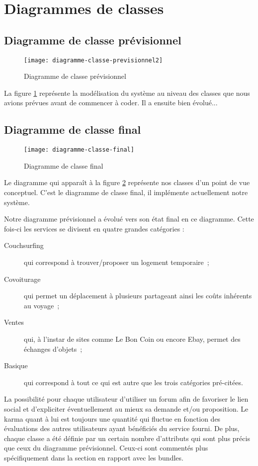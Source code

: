 \section{Diagrammes de classes}

\subsection{Diagramme de classe prévisionnel}

\begin{figure}[ht]
\centering
\texttt{[image: diagramme-classe-previsionnel2]}
\caption{Diagramme de classe prévisionnel}
\label{fig:diagramme-classe-previsionnel2}
\end{figure}

La figure \ref{fig:diagramme-classe-previsionnel2} représente la modélisation du système au niveau des classes que nous avions prévues avant de commencer à coder. 
Il a ensuite bien évolué...

\subsection{Diagramme de classe final}
\begin{figure}[ht]
\centering
\texttt{[image: diagramme-classe-final]}
\caption{Diagramme de classe final}
\label{fig:diagramme-classe-final}
\end{figure}

Le diagramme qui apparaît à la figure \ref{fig:diagramme-classe-final} représente nos classes d'un point de vue conceptuel. C'est le diagramme de classe final, il implémente actuellement notre système.


Notre diagramme prévisionnel a évolué vers son état final en ce diagramme. 
Cette fois-ci les services se divisent en quatre grandes catégories :
\begin{description}
\item [Couchsurfing] qui correspond à trouver/proposer un logement temporaire~;
\item [Covoiturage] qui permet un déplacement à plusieurs partageant ainsi les coûts inhérents au voyage~; 
\item [Ventes] qui, à l’instar de sites comme Le Bon Coin ou encore Ebay, permet des échanges d'objets~; 
\item [Basique] qui correspond à tout ce qui est autre que les trois catégories pré-citées.
\end{description}

La possibilité pour chaque utilisateur d’utiliser un forum afin de favoriser le lien social et d’expliciter éventuellement au mieux sa demande et/ou proposition. 
Le karma quant à lui est toujours une quantité qui fluctue en fonction des évaluations des autres utilisateurs ayant bénéficiés du service fourni. 
De plus, chaque classe a été définie par un certain nombre d’attributs qui sont plus précis que ceux du diagramme prévisionnel. Ceux-ci sont commentés plus spécifiquement dans la section en rapport avec les bundles.

